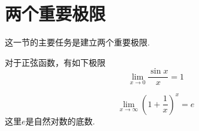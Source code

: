 
\section{两个重要极限}
\label{sec:two-import-function-limit}

这一节的主要任务是建立两个重要极限.

\begin{theorem}
  对于正弦函数，有如下极限
  \[ \lim_{x \to 0} \frac{\sin{x}}{x} = 1 \]
\end{theorem}

\begin{theorem}
  \[ \lim_{x \to \infty} \left( 1+\frac{1}{x} \right)^x = e \]
  这里$e$是自然对数的底数.
\end{theorem}


